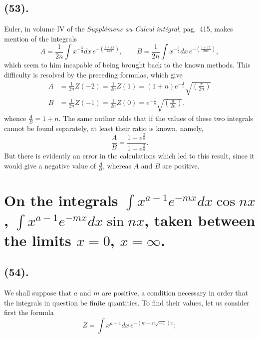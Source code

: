 \documentclass{article}
\begin{document}
\subsection*{(53).}

Euler, in volume IV of the \emph{Supplémens au Calcul intégral}, pag.\ 415, makes mention of the integrals
\[ A=\frac{1}{2n}\int x^{-\frac{5}{2}}dx\,e^{-\left(\frac{1+xx}{2nx}\right)},\qquad B=\frac{1}{2n}\int x^{-\frac{3}{2}}dx\,e^{-\left(\frac{1+xx}{2nx}\right)}, \]
which seem to him incapable of being brought back to the known methods. This difficulty is resolved by the preceding formulas, which give
\[ \begin{aligned} A&=\frac{1}{2n}Z(-2)=\frac{1}{2n}Z(1)=(1+n)e^{-\frac{1}{n}}\sqrt{\left(\frac{\pi}{2n}\right)}\\ B&=\frac{1}{2n}Z(-1)=\frac{1}{2n}Z(0)=e^{-\frac{1}{n}}\sqrt{\left(\frac{\pi}{2n}\right)}, \end{aligned} \]
whence $\frac{A}{B}=1+n$. The same author adds that if the values of these two integrals cannot be found separately, at least their ratio is known, namely,
\[ \frac{A}{B}=\frac{1+e^{\frac{2}{n}}}{1-e^{\frac{2}{n}}}. \]
But there is evidently an error in the calculations which led to this result, since it would give a negative value of $\frac{A}{B}$, whereas $A$ and $B$ are positive.

\section*{On the integrals $\displaystyle\int x^{a-1}e^{-mx}dx\cos nx$, $\displaystyle\int x^{a-1}e^{-mx}dx\sin nx$, taken between the limits $x=0$, $x=\infty$.}

\subsection*{(54).}

We shall suppose that $a$ and $m$ are positive, a condition necessary in order that the integrals in question be finite quantities. To find their values, let us consider first the formula
\[ Z=\int x^{a-1}dx\,e^{-(m-n\sqrt{-1})x}; \]
\end{document}
